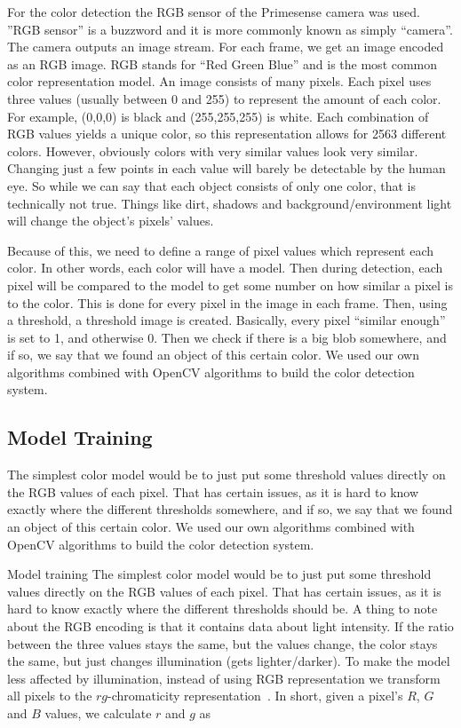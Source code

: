 \documentclass[10pt,a4paper,twocolumn]{article}
\begin{document}
For the color detection the RGB sensor of the Primesense camera was used. ”RGB
sensor” is a buzzword and it is more commonly known as simply “camera”. The
camera outputs an image stream. For each frame, we get an image encoded as an
RGB image. RGB stands for “Red Green Blue” and is the most common color
representation model. An image consists of many pixels. Each pixel uses three
values (usually between 0 and 255) to represent the amount of each color. For
example, (0,0,0) is black and (255,255,255) is white. Each combination of RGB
values yields a unique color, so this representation allows for 2563 different
colors. However, obviously colors with very similar values look very similar.
Changing just a few points in each value will barely be detectable by the human
eye. So while we can say that each object consists of only one color, that is
technically not true. Things like dirt, shadows and background/environment light
will change the object’s pixels’ values.

Because of this, we need to define a range of pixel values which represent each
color. In other words, each color will have a model. Then during detection, each
pixel will be compared to the model to get some number on how similar a pixel is
to the color. This is done for every pixel in the image in each frame. Then,
using a threshold, a threshold image is created. Basically, every pixel “similar
enough” is set to 1, and otherwise 0. Then we check if there is a big blob
somewhere, and if so, we say that we found an object of this certain color. We
used our own algorithms combined with OpenCV algorithms to build the color
detection system.

\subsection{Model Training}
The simplest color model would be to just put some threshold values directly on
the RGB values of each pixel. That has certain issues, as it is hard to know
exactly where the different thresholds somewhere, and if so, we say that we
found an object of this certain color. We used our own algorithms combined with
OpenCV algorithms to build the color detection system.

Model training The simplest color model would be to just put some threshold
values directly on the RGB values of each pixel. That has certain issues, as it
is hard to know exactly where the different thresholds should be. A thing to
note about the RGB encoding is that it contains data about light intensity. If
the ratio between the three values stays the same, but the values change, the
color stays the same, but just changes illumination (gets lighter/darker). To
make the model less affected by illumination, instead of using RGB
representation we transform all pixels to the $rg$-chromaticity
representation~\cite{rgchrom}. In short, given a pixel’s $R$, $G$ and $B$ values, we
calculate $r$ and $g$ as
\end{document}
